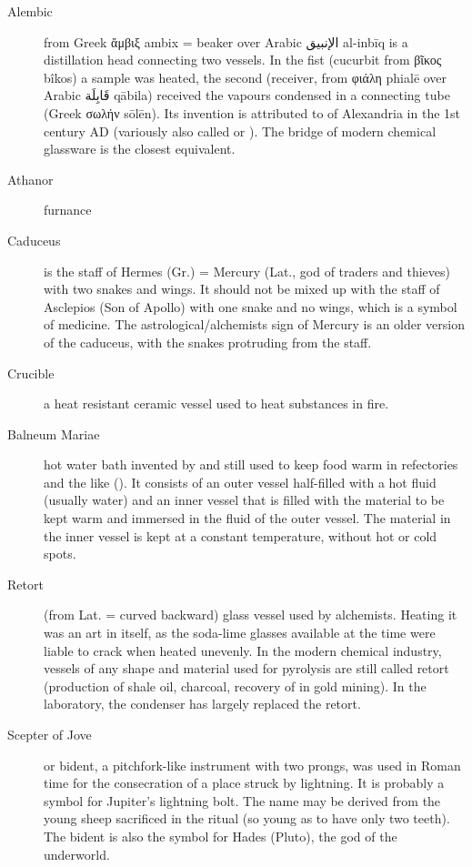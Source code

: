 \documentclass[notitlepage,british]{scrartcl}
\begin{document}
\begin{refsection}
\begin{description}
  \item[Alembic]{from Greek \foreignlanguage{greek}{ἄμβιξ} ambix = beaker over Arabic \foreignlanguage{arabic}{الإنبيق} al-inbīq is a distillation head connecting two vessels. In the fist (cucurbit from \foreignlanguage{greek}{βῖκος} bîkos) a sample was heated, the second (receiver, from \foreignlanguage{greek}{φιάλη} phialē over Arabic \foreignlanguage{arabic}{قَابِلَة} qābila) received the vapours condensed in a connecting tube (Greek \foreignlanguage{greek}{σωλήν} sōlēn). Its invention is attributed to  of Alexandria in the 1st century AD (variously also called  or ). The bridge of modern chemical glassware is the closest equivalent.}
  \item[Athanor]{furnance}
  \item[Caduceus]{is the staff of Hermes (Gr.) = Mercury (Lat., god of traders and thieves) with two snakes and wings. It should not be mixed up with the staff of Asclepios (Son of Apollo) with one snake and no wings, which is a symbol of medicine. The astrological/alchemists sign of Mercury is an older version of the caduceus, with the snakes protruding from the staff.}
  \item[Crucible]{a heat resistant ceramic vessel used to heat substances in fire. }
  \item[Balneum Mariae ]{hot water bath invented by  and still used to keep food warm in refectories and the like (). It consists of an outer vessel half-filled with a hot fluid (usually water) and an inner vessel that is filled with the material to be kept warm and immersed in the fluid of the outer vessel. The material in the inner vessel is kept at a constant temperature, without hot or cold spots.}
  \item[Retort]{(from Lat.  = curved backward) glass vessel used by alchemists. Heating it was an art in itself, as the soda-lime glasses available at the time were liable to crack when heated unevenly. In the modern chemical industry, vessels of any shape and material used for pyrolysis are still called retort (production of shale oil, charcoal, recovery of  in gold mining). In the laboratory, the  condenser has largely replaced the retort. }
  \item[Scepter of Jove]{or bident, a pitchfork-like instrument with two prongs, was used in Roman time for the consecration of a place struck by lightning. It is probably a symbol for Jupiter's lightning bolt. The name may be derived from the young sheep sacrificed in the ritual (so young as to have only two teeth). The bident is also the symbol for Hades (Pluto), the god of the underworld. }

\end{description}
\end{refsection}
\end{document}
